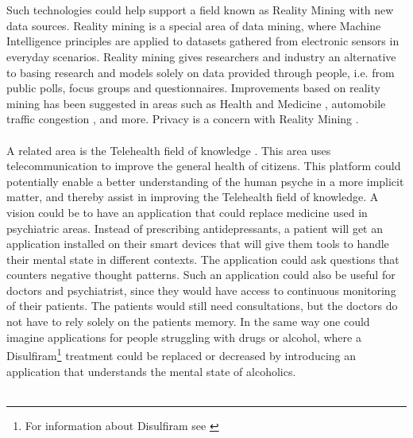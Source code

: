 \\\\
Such technologies could help support a field known as Reality Mining \parencite{eagle2006_reality_mining_definition} with new data sources. Reality mining is a special area of data mining, where Machine Intelligence principles are applied to datasets gathered from electronic sensors in everyday scenarios. Reality mining gives researchers and industry an alternative to basing research and models solely on data provided through people, i.e. from public polls, focus groups and questionnaires. Improvements based on reality mining has been suggested in areas such as Health and Medicine \parencite{pentland2009_reality_mining_health_medicine}, automobile traffic congestion \parencite{pentland2009reality_mining_mobile_communication_gps}, and more. Privacy is a concern with Reality Mining \parencite{madan2009_reality_mining_privacy}.      
\\\\
A related area is the Telehealth field of knowledge \parencite{telehealth_aau}. This area uses telecommunication to improve the general health of citizens. This platform could potentially enable a better understanding of the human psyche in a more implicit matter, and thereby assist in improving the Telehealth field of knowledge. A vision could be to have an application that could replace medicine used in psychiatric areas. Instead of prescribing antidepressants, a patient will get an application installed on their smart devices that will give them tools to handle their mental state in different contexts. The application could ask questions that counters negative thought patterns. Such an application could also be useful for doctors and psychiatrist, since they would have access to continuous monitoring of their patients. The patients would still need consultations, but the doctors do not have to rely solely on the patients memory. In the same way one could imagine applications for people struggling with drugs or alcohol, where a Disulfiram\footnote{For information about Disulfiram see \textcite{nlm_disulfiram}} treatment could be replaced or decreased by introducing an application that understands the mental state of alcoholics.
\\\\
